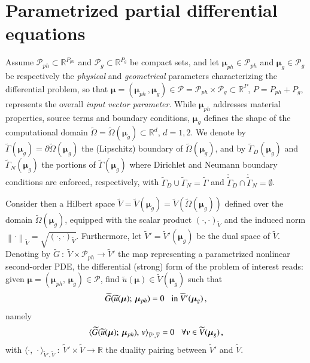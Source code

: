\documentclass{elsarticle}
\numberwithin{equation}{section}
\theoremstyle{theorem}
\theoremstyle{definition}
\theoremstyle{remark}
\theoremstyle{proposition}
\numberwithin{figure}{section}
\newcommand{\norm}[1]{\left\lVert#1\right\rVert}
\newcommand{\wt}[1]{\widetilde{#1}}
\newcommand{\bg}[1]{\boldsymbol{#1}}
\begin{document}
		
		
	\section{Parametrized partial differential equations}
	\label{section:Parametrized partial differential equations}
	
		Assume $\mathcal{P}_{ph} \subset \mathbb{R}^{P_{ph}}$ and $\mathcal{P}_g \subset \mathbb{R}^{P_{g}}$ be compact sets, and let $\boldsymbol{\mu}_{ph} \in \mathcal{P}_{ph}$ and $\boldsymbol{\mu}_{g} \in \mathcal{P}_{g}$ be respectively the \emph{physical} and \emph{geometrical} parameters characterizing the differential problem, so that $\boldsymbol{\mu} = (\boldsymbol{\mu}_{ph} \, , \boldsymbol{\mu}_{g}) \in \mathcal{P} = \mathcal{P}_{ph} \times \mathcal{P}_g \subset \mathbb{R}^P$, $P = P_{ph} + P_g$, represents the overall \emph{input vector parameter}. While $\bg{\mu}_{ph}$ addresses material properties, source terms and boundary conditions, $\bg{\mu}_g$ defines the shape of the computational domain $\wt{\Omega} = \wt{\Omega}(\boldsymbol{\mu}_g) \subset \mathbb{R}^d$, $d = 1,2$. We denote by $\wt{\Gamma}(\boldsymbol{\mu}_g) = \partial \wt{\Omega}(\boldsymbol{\mu}_g)$ the (Lipschitz) boundary of $\wt{\Omega}(\boldsymbol{\mu}_g)$, and by $\wt{\Gamma}_D(\boldsymbol{\mu}_g)$ and $\wt{\Gamma}_N(\boldsymbol{\mu}_g)$ the portions of $\wt{\Gamma}(\boldsymbol{\mu}_g)$ where Dirichlet and Neumann boundary conditions are enforced, respectively, with $\wt{\Gamma}_D \cup \wt{\Gamma}_N = \wt{\Gamma}$ and $\mathring{\wt{\Gamma}}_D \cap \mathring{\wt{\Gamma}}_N = \emptyset$.
		
		Consider then a Hilbert space $\wt{V} = \wt{V}(\bg{\mu}_g) = \wt{V}(\wt{\Omega}(\boldsymbol{\mu}_g))$ defined over the domain $\wt{\Omega}(\boldsymbol{\mu}_g)$, equipped with the scalar product $(\cdot, \cdot)_{\wt{V}}$ and the induced norm $\norm{\cdot}_{\wt{V}} = \sqrt{(\cdot, \cdot)_{\wt{V}}}$. Furthermore, let $\wt{V}' = \wt{V}'(\boldsymbol{\mu}_g)$ be the dual space of $\wt{V}$. Denoting by $\wt{G} ~ : ~ \wt{V} \times \mathcal{P}_{ph} \rightarrow \wt{V}'$ the map representing a parametrized nonlinear second-order PDE, the differential (strong) form of the problem of interest reads: given $\bg{\mu} = (\bg{\mu}_{ph}, \, \bg{\mu}_g) \in \mathcal{P}$, find $\wt{u}(\boldsymbol{\mu}) \in \wt{V}(\bg{\mu}_g)$ such that
		\begin{equation}
			\label{eq:pde-differential-form}
			\wt{G}(\wt{u}(\bg{\mu}); \, \bg{\mu}_{ph}) = 0 \hspace*{0.3cm} \text{in $\wt{V}'(\bg{\mu}_g)$} \, ,
		\end{equation}
		namely
		\begin{equation*}
			\langle \wt{G}(\wt{u}(\bg{\mu}); \, \bg{\mu}_{ph}), \, v \rangle_{\wt{V}',\wt{V}} = 0 \hspace*{0.3cm} \forall v \in \wt{V}(\bg{\mu}_g) \, ,
		\end{equation*}
		with $\langle \cdot, \, \cdot \rangle_{\wt{V}',\wt{V}} ~ : ~ \wt{V}' \times \wt{V} \rightarrow \mathbb{R}$ the duality pairing between $\wt{V}'$ and $\wt{V}$. %
		
\end{document}
